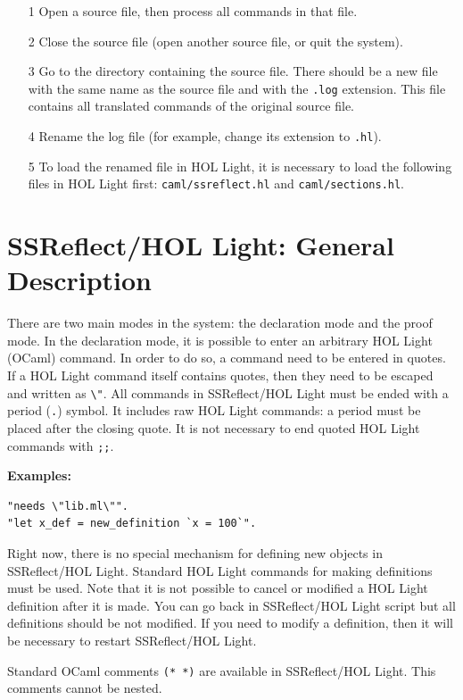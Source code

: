 \documentclass[a4paper]{article}
\begin{document}
\begin{itemize}
\item[1] Open a source file, then process all commands in that file.
\item[2] Close the source file (open another source file, or quit the system).
\item[3] Go to the directory containing the source file. There should be a new file with the same name as the source file and with the {\tt .log} extension. This file contains all translated commands of the original source file.
\item[4] Rename the log file (for example, change its extension to {\tt .hl}).
\item[5] To load the renamed file in HOL Light, it is necessary to load the following files in HOL Light first: {\tt caml/ssreflect.hl} and {\tt caml/sections.hl}.
\end{itemize}



\section{SSReflect/HOL Light: General Description}

There are two main modes in the system: the declaration mode and the proof mode. In the declaration mode, it is possible to enter an arbitrary HOL Light (OCaml) command. In order to do so, a command need to be entered in quotes. If a HOL Light command itself contains quotes, then they need to be escaped and written as \verb|\"|. All commands in SSReflect/HOL Light must be ended with a period (\verb|.|) symbol. It includes raw HOL Light commands: a period must be placed after the closing quote. It is not necessary to end quoted HOL Light commands with \verb|;;|.

{\bf Examples:}
\begin{verbatim}
"needs \"lib.ml\"".
"let x_def = new_definition `x = 100`".
\end{verbatim}

Right now, there is no special mechanism for defining new objects in SSReflect/HOL Light. Standard HOL Light commands for making definitions must be used. Note that it is not possible to cancel or modified a HOL Light definition after it is made. You can go back in SSReflect/HOL Light script but all definitions should be not modified. If you need to modify a definition, then it will be necessary to restart SSReflect/HOL Light.

Standard OCaml comments \verb|(* *)| are available in SSReflect/HOL Light. This comments cannot be nested.
\end{document}
